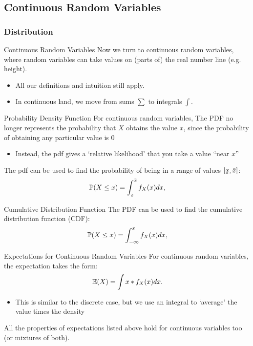 \documentclass[aspectratio=169,t,11pt,table]{beamer}
\begin{document}
\subsection*{Continuous Random Variables}
\subsubsection*{Distribution}

\begin{frame}{Continuous Random Variables}
  Now we turn to \alert{continuous random variables}, where random variables can take values on (parts of) the real number line (e.g. height).
  \begin{itemize}
    \item All our definitions and intuition still apply.

    \item In continuous land, we move from sums $\sum$ to integrals $\int$.
  \end{itemize}
\end{frame}

\begin{frame}{Probability Density Function}
  For continuous random variables, The PDF no longer represents the probability that $X$ obtains the value $x$, since the probability of obtaining any particular value is 0
  \begin{itemize}
    \item Instead, the pdf gives a `relative likelihood' that you take a value ``near $x$''
  \end{itemize}

  \pause
  \bigskip
  The pdf can be used to find the probability of being in a range of values $[\ubar{x}, \bar{x}]$:
  \[
    \P{X \leq x} = \int_{\ubar{x}}^{\bar{x}} f_{X}(x) dx,
  \]
\end{frame}

\begin{frame}{Cumulative Distribution Function}
  The PDF can be used to find the cumulative distribution function (CDF):
  \[
    \P{X \leq x} = \int_{-\infty}^x f_{X}(x) dx,
  \]
\end{frame}


\begin{frame}{Expectations for Continuous Random Variables}
  For continuous random variables, the expectation takes the form:
  \[
    \E{X} = \int x * f_{X}(x) dx.
  \]
  \begin{itemize}
    \item This is similar to the discrete case, but we use an integral to `average' the value times the density
  \end{itemize}

  \pause
  \bigskip
  All the properties of expectations listed above hold for continuous variables too (or mixtures of both).
\end{frame}
\end{document}
